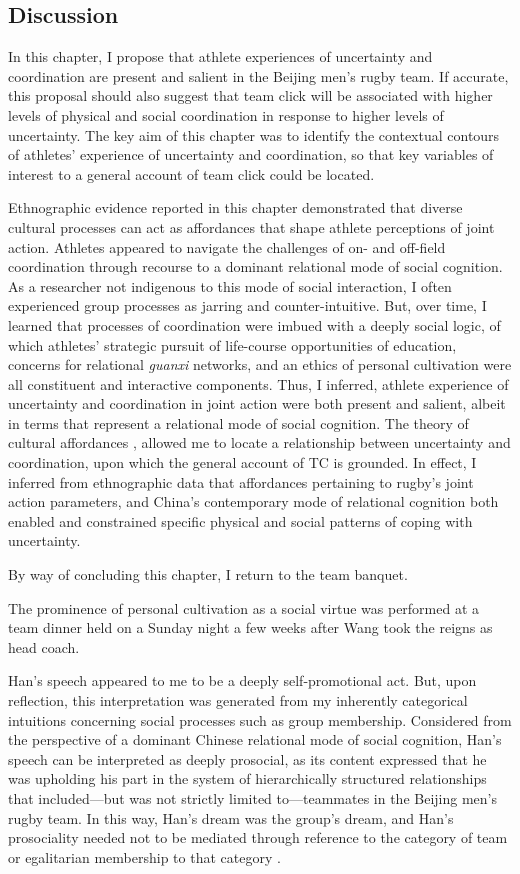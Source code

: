 \begin{CJK}{UTF8}{gbsn}
\section{Discussion\label{sect:discussEthnoField}}
In this chapter, I propose that athlete experiences of uncertainty and coordination are present and salient in the Beijing men's rugby team.  If accurate, this proposal should also suggest that team click will be associated with higher levels of physical and social coordination in response to higher levels of uncertainty.  The key aim of this chapter was to identify the contextual contours of athletes' experience of uncertainty and coordination, so that key variables of interest to a general account of team click could be located.

Ethnographic evidence reported in this chapter demonstrated that diverse cultural processes can act as affordances that shape athlete perceptions of joint action.  Athletes appeared to navigate the challenges of on- and off-field coordination through recourse to a dominant relational mode of social cognition.  As a researcher not indigenous to this mode of social interaction, I often experienced group processes as jarring and counter-intuitive.  But, over time, I learned that processes of coordination were imbued with a deeply social logic, of which athletes' strategic pursuit of life-course opportunities of education, concerns for relational \textit{guanxi} networks, and an ethics of personal cultivation were all constituent and interactive components.  Thus, I inferred, athlete experience of uncertainty and coordination in joint action were both present and salient, albeit in terms that represent a relational mode of social cognition.  The theory of cultural affordances \citep{Ramstead2016}, allowed me to locate a relationship between uncertainty and coordination, upon which the general account of TC is grounded.  In effect, I inferred from ethnographic data that affordances pertaining to rugby's joint action parameters, and China's contemporary mode of relational cognition both enabled and constrained specific physical and social patterns of coping with uncertainty.

By way of concluding this chapter, I return to the team banquet.


The prominence of personal cultivation as a social virtue was performed at a team dinner held on a Sunday night a few weeks after Wang took the reigns as head coach.

Han's speech appeared to me to be a deeply self-promotional act. But, upon reflection, this interpretation was generated from my inherently categorical intuitions concerning social processes such as group membership.  Considered from the perspective of a dominant Chinese relational mode of social cognition, Han's speech can be interpreted as deeply prosocial, as its content expressed that he was upholding his part in the system of hierarchically structured relationships that included---but was not strictly limited to---teammates in the Beijing men's rugby team.  In this way, Han's dream was the group's dream, and Han's prosociality needed not to be mediated through reference to the category of team or egalitarian membership to that category \citep{Liu2009}.


\end{CJK}

